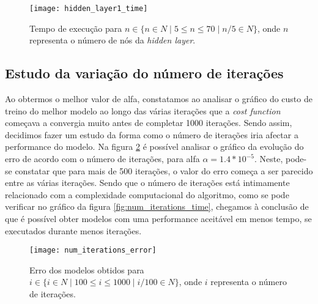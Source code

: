 \begin{figure}[!t]
\centering
\texttt{[image: hidden\_layer1\_time]}
\caption{Tempo de execução para $n \in \{ n \in \!N \mid 5  \leq n \leq 70 \mid n / 5 \in \!N \}$, onde $n$ representa o número de nós da \textit{hidden layer}.}
\label{fig:hiddent_time}
\end{figure}

\subsection{Estudo da variação do número de iterações}
Ao obtermos o melhor valor de alfa, constatamos ao analisar o gráfico do custo de treino do melhor modelo ao longo das várias iterações que a \textit{cost function} começava a convergia muito antes de completar 1000 iterações. Sendo assim, decidimos fazer um estudo da forma como o número de iterações iria afectar a performance do modelo. Na figura \ref{fig:num_iterations_error} é possível analisar o gráfico da evolução do erro de acordo com o número de iterações, para alfa $\alpha = 1.4 * 10^{-5}$. Neste, pode-se constatar que para mais de 500 iterações, o valor do erro começa a ser parecido entre as várias iterações. Sendo que o número de iterações está intimamente relacionado com a complexidade computacional do algoritmo, como se pode verificar no gráfico da figura \ref{fig:num_iterations_time},   chegamos à conclusão de que é possível obter modelos com uma performance aceitável em menos tempo, se executados durante menos iterações. 

\begin{figure}[!t]
\centering
\texttt{[image: num\_iterations\_error]}
\caption{Erro dos modelos obtidos para $i \in \{ i \in \!N \mid 100 \leq i \leq 1000 \mid i/100 \in \!N \}$, onde $i$ representa o número de iterações.}
\label{fig:num_iterations_error}
\end{figure}

